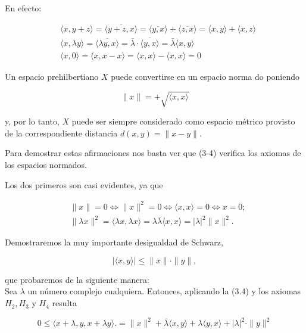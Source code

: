 \documentclass[10pt]{article}
\theoremstyle{plain}
\theoremstyle{definition}
\theoremstyle{remark}
\begin{document}
En efecto:

$$
\begin{aligned}
& \langle x, y+z\rangle=\langle\overline{y+z, x}\rangle=\langle\overline{y, x}\rangle+\langle\overline{z, x}\rangle=\langle x, y\rangle+\langle x, z\rangle \\
& \langle x, \lambda y\rangle=\langle\overline{\lambda y, x}\rangle=\bar{\lambda} \cdot \overline{\langle y, x\rangle}=\bar{\lambda}\langle x, y\rangle \\
& \langle x, 0\rangle=\langle x, x-x\rangle=\langle x, x\rangle-\langle x, x\rangle=0
\end{aligned}
$$

Un espacio prehilbertiano $X$ puede convertirse en un espacio norma do poniendo


\begin{equation*}
\|x\|=+\sqrt{\langle x, x\rangle} \tag{3-4}
\end{equation*}


y, por lo tanto, $X$ puede ser siempre considerado como espacio métrico provisto de la correspondiente distancia $d(x, y)=\|x-y\|$.

Para demostrar estas afirmaciones nos basta ver que (3-4) verifica los axiomas de los espacios normados.

Los dos primeros son casi evidentes, ya que

$$
\begin{aligned}
& \|x\|=0 \Longleftrightarrow\|x\|^{2}=0 \Longleftrightarrow\langle x, x\rangle=0 \Longleftrightarrow x=0 ; \\
& \|\lambda x\|^{2}=\langle\lambda x, \lambda x\rangle=\lambda \bar{\lambda}\langle x, x\rangle=|\lambda|^{2}\|x\|^{2} .
\end{aligned}
$$

Demostraremos la muy importante desigualdad de Schwarz,


\begin{equation*}
|\langle x, y\rangle| \leqslant\|x\| \cdot\|y\|, \tag{3-5}
\end{equation*}



que probaremos de la siguiente manera:\\
Sea $\lambda$ un número complejo cualquiera. Entonces, aplicando la (3.4) y los axiomas $H_{2}, H_{3}$ y $H_{4}$ resulta

$$
0 \leqslant\langle x+\lambda, y, x+\lambda y\rangle .=\|x\|^{2}+\bar{\lambda}\langle x, y\rangle+\lambda\langle y, x\rangle+|\lambda|^{2} \cdot\|y\|^{2}
$$
\end{document}
